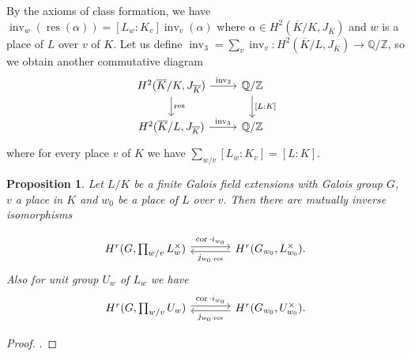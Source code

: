 \documentclass{article}
\newtheorem{proposition}{Proposition}[section]
\theoremstyle{break}
\def\cori{\mathop{\mathrm{cor}}\nolimits}
\def\inv{\mathop{\mathrm{inv}}\nolimits}
\def\inva{\mathop{\mathrm{inv}}\nolimits}
\def\id{\mathop{\mathrm{Id}}\nolimits}
\def\rest{\mathop{\mathrm{res}}\nolimits}
\def\cori{\mathop{\mathrm{cor}}\nolimits}
\def\inf{\mathop{\mathrm{inf}}\nolimits}
\def\inv{\mathop{\mathrm{inv}}\nolimits}
\begin{document}
By the axioms of class formation, we have $\inva_{w} (\rest ( \alpha))= [L_w : K_v] \inva_{v} (\alpha)$ where $\alpha \in H^{2}(\overline{K}/K , J_{\overline{K}} )$ and $w$ is a place of $L$ over $v$ of $K$. Let us define $\inv_{3}=\sum_{v}^{} \inv_v: H^{2}( \overline{K}/L , J_{\overline{K}} ) \rightarrow  \mathbb{Q}/\mathbb{Z}$, so we obtain another commutative diagram
\[
\begin{tikzcd}
H^{2}( \overline{K}/K , J_{\overline{K}} )\arrow{r}{\inva_2}\arrow{d}{\rest}& \mathbb{Q}/\mathbb{Z}\arrow{d}{[L:K]}\\
H^{2}( \overline{K}/L , J_{\overline{K}} )\arrow{r}{\inva_3}& \mathbb{Q}/\mathbb{Z}
\end{tikzcd}
\]
where for every place $v$ of $K$ we have $\sum_{w/v}^{}[L_w: K_v] = [L:K]$.
\begin{proposition}
	Let $L/K$ be a finite Galois field extensions with Galois group $G$, $v$ a place in $K$ and $w_0$ be a place of $L$ over $v$. Then there are mutually inverse isomorphisms

\[
\begin{tikzcd}[column sep= large]
	H^{r}( G, \prod_{w/v}^{} L_{w}^{\times} ) \arrow[shift right =-0.5 ex]{r}{\cori \cdot i_{w_{0}}} & \arrow[shift left = 0.5 ex]{l}{j_{w_{0}\cdot \rest}} H^{r}( G_{w_{0}}, L_{w_{0}}^{\times} ).
	\end{tikzcd}	
	\] 
Also for unit group $U_{w}$ of $L_w$ we have 
\[\begin{tikzcd}[column sep=large]
H^{r}( G, \prod_{w/v}^{} U_w ) \arrow[ shift left = 0.5ex]{r} {\cori \cdot i_{w_{0}}} & \arrow[ shift left =0.5 ex]{l} {j_{w_{0}\cdot \rest}} H^{r}( G_{w_{0}}, U_{w_{0}}^{\times} ).
\end{tikzcd}\]  

\end{proposition}
\begin{proof}
\cite[Proposition 7.2]{Cassels}.
\end{proof}
\end{document}

